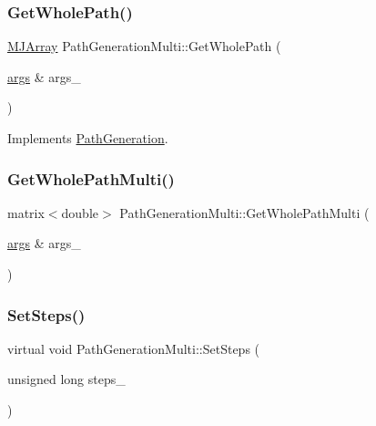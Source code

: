 \hypertarget{classPathGenerationMulti_ab47e41a3cc266a81ac1770868b5ac7ca}{}\label{classPathGenerationMulti_ab47e41a3cc266a81ac1770868b5ac7ca} 
\subsubsection{\texorpdfstring{Get\+Whole\+Path()}{GetWholePath()}}
{\footnotesize\ttfamily \hyperlink{classMJArray}{M\+J\+Array} Path\+Generation\+Multi\+::\+Get\+Whole\+Path (\begin{DoxyParamCaption}\item[{\hyperlink{path__generation_8h_a75c13cde2074f502cc4348c70528572d}{args} \&}]{args\+\_\+ }\end{DoxyParamCaption})\hspace{0.3cm}{\ttfamily [virtual]}}



Implements \hyperlink{classPathGeneration_ace7520fed7b6a7711f4d3684c974cb76}{Path\+Generation}.

\hypertarget{classPathGenerationMulti_af2e36af2e3347fd0ae71775c7133c5c9}{}\label{classPathGenerationMulti_af2e36af2e3347fd0ae71775c7133c5c9} 
\subsubsection{\texorpdfstring{Get\+Whole\+Path\+Multi()}{GetWholePathMulti()}}
{\footnotesize\ttfamily matrix$<$double$>$ Path\+Generation\+Multi\+::\+Get\+Whole\+Path\+Multi (\begin{DoxyParamCaption}\item[{\hyperlink{path__generation_8h_a75c13cde2074f502cc4348c70528572d}{args} \&}]{args\+\_\+ }\end{DoxyParamCaption})}

\hypertarget{classPathGenerationMulti_ac650e3d724dc4cf3443305b8d1f48a4d}{}\label{classPathGenerationMulti_ac650e3d724dc4cf3443305b8d1f48a4d} 
\subsubsection{\texorpdfstring{Set\+Steps()}{SetSteps()}}
{\footnotesize\ttfamily virtual void Path\+Generation\+Multi\+::\+Set\+Steps (\begin{DoxyParamCaption}\item[{unsigned long}]{steps\+\_\+ }\end{DoxyParamCaption})\hspace{0.3cm}{\ttfamily [virtual]}}



